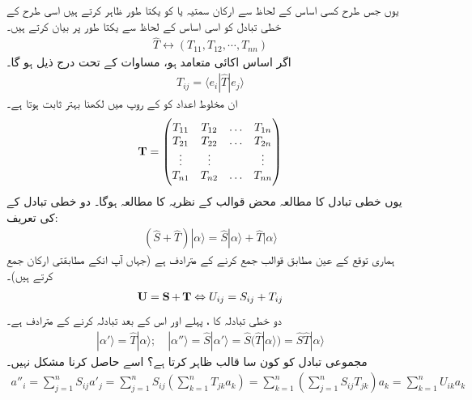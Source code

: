 یوں جس طرح کسی اساس کے لحاظ سے  ارکان  سمتیہ یا  کو یکتا طور ظاہر کرتے ہیں اسی طرح  کے    خطی تبادل  کو اسی اساس کے لحاظ سے یکتا طور پر بیان کرتے ہیں۔
\begin{align}
	\hat{T}\leftrightarrow(T_{11}, T_{12}, \cdots, T_{nn})
\end{align}
اگر اساس اکائی متعامد ہو،   مساوات   کے تحت درج ذیل ہو گا۔
\begin{align}
	T_{ij}=\langle e_i|\hat{T}|e_j\rangle
\end{align}
ان مخلوط اعداد کو  کے روپ  میں لکھنا بہتر ثابت ہوتا ہے۔ 
\begin{align}
	\operatorname{\mathbf{T}}=
	\begin{pmatrix}
		T_{11} & T_{12} & \dots & T_{1n}\\
		T_{21} & T_{22} & \dots & T_{2n}\\
		\vdots & \vdots & & \vdots\\
		T_{n1} & T_{n2} & \dots & T_{nn}
	\end{pmatrix}
\end{align}
یوں خطی تبادل کا مطالعہ  محض قوالب کے نظریہ کا مطالعہ ہوگا۔  دو خطی تبادل کے     کی تعریف:
\begin{align}
	(\hat{S}+\hat{T})|\alpha\rangle=\hat{S}|\alpha\rangle+\hat{T}|\alpha\rangle
\end{align}
  ہماری توقع کے عین مطابق   قوالب جمع کرنے کے مترادف ہے  (جہاں آپ انکے مطابقتی ارکان جمع کرتے ہیں)۔
\begin{align}
	\operatorname{\mathbf{U}} = \operatorname{\mathbf{S}}+\operatorname{\mathbf{T}} \Leftrightarrow U_{ij}=S_{ij}+T_{ij}
\end{align}
دو خطی تبادلہ  کا    ،  پہلے  اور اس کے بعد  تبادلہ  کرنے کے مترادف ہے۔
\begin{align}
	|\alpha'\rangle=\hat{T}|\alpha\rangle;\quad|\alpha''\rangle=\hat{S}|\alpha'\rangle=\hat{S}(\hat{T}|\alpha\rangle)=\hat{S}\hat{T}|\alpha\rangle
\end{align}
مجموعی تبادل  کو کون سا قالب  ظاہر کرتا ہے؟ اسے حاصل کرنا مشکل نہیں۔
\begin{align*}
	a''_i=\sum_{j=1}^{n}S_{ij}a'_j=\sum_{j=1}^{n}S_{ij}\left(\sum_{k=1}^{n}T_{jk}a_k\right)=\sum_{k=1}^{n}\left(\sum_{j=1}^{n}S_{ij}T_{jk}\right)a_k=\sum_{k=1}^{n}U_{ik}a_k
\end{align*}
